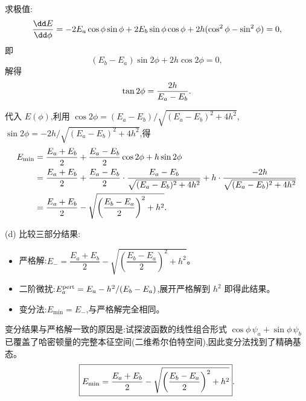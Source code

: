 \begin{question}
\begin{solution}
求极值:
\[
{\dd E\over\dd\phi}=-2E_a\cos\phi\sin\phi+2E_b\sin\phi\cos\phi+2h(\cos^2\phi-\sin^2\phi)=0,
\]
即
\[
(E_b-E_a)\sin2\phi+2h\cos2\phi=0,
\]
解得
\[
\tan2\phi={2h\over E_a-E_b}.
\]

代入 $E(\phi)$,利用 $\cos2\phi=(E_a-E_b)/\sqrt{(E_a-E_b)^2+4h^2}$,$\sin2\phi=-2h/\sqrt{(E_a-E_b)^2+4h^2}$,得
\[
\begin{aligned}
E_{\min}&={E_a+E_b\over2}+{E_a-E_b\over2}\cos2\phi+h\sin2\phi\\
&={E_a+E_b\over2}+{E_a-E_b\over2}\cdot{E_a-E_b\over\sqrt{(E_a-E_b)^2+4h^2}}
+h\cdot{-2h\over\sqrt{(E_a-E_b)^2+4h^2}}\\
&={E_a+E_b\over2}-\sqrt{\left({E_b-E_a\over2}\right)^2+h^2}.
\end{aligned}
\]

(d) 比较三部分结果:
\begin{itemize}
\item 严格解:$E_-=\dfrac{E_a+E_b}{2}-\sqrt{\left(\dfrac{E_b-E_a}{2}\right)^2+h^2}$。
\item 二阶微扰:$E_a^{\rm pert}=E_a-h^2/(E_b-E_a)$,展开严格解到 $h^2$ 即得此结果。
\item 变分法:$E_{\min}=E_-$,与严格解完全相同。
\end{itemize}
变分结果与严格解一致的原因是:试探波函数的线性组合形式 $\cos\phi\,\psi_a+\sin\phi\,\psi_b$ 已覆盖了哈密顿量的完整本征空间(二维希尔伯特空间),因此变分法找到了精确基态。
\[
\boxed{E_{\min}={E_a+E_b\over2}-\sqrt{\left({E_b-E_a\over2}\right)^2+h^2}}.
\]
\end{solution}
\end{question}

